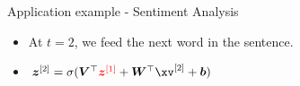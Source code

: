 \documentclass[11pt,compress,t,notes=noshow]{beamer}
\begin{document}
\begin{frame} {Application example - Sentiment Analysis}
  \begin{itemize}
    \item At $t = 2$, we feed the next word in the sentence.
    \item $\bm{z}^{[2]} = \sigma(\bm{V}^\top\textcolor{red}{\bm{z}^{[1]}} + \bm{W}^\top \xv^{[2]} + \bm{b})$
  \end{itemize}
  \begin{figure}
      \centering
  \end{figure}
\end{frame}
\end{document}
